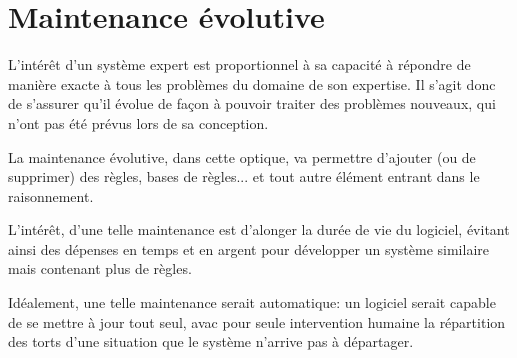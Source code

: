 \section{Maintenance évolutive}

L'intérêt d'un système expert est proportionnel à sa capacité à répondre
de manière exacte à tous les problèmes du domaine de son expertise. Il 
s'agit donc de s'assurer qu'il évolue de façon à pouvoir traiter des
problèmes nouveaux, qui n'ont pas été prévus lors de sa conception.

La maintenance évolutive, dans cette optique, va permettre d'ajouter (ou
de supprimer) des règles, bases de règles... et tout autre élément entrant
dans le raisonnement.

L'intérêt, d'une telle maintenance est d'alonger la durée de vie du
logiciel, évitant ainsi des dépenses en temps et en argent pour 
développer un système similaire mais contenant plus de règles.

Idéalement, une telle maintenance serait automatique: un logiciel serait
capable de se mettre à jour tout seul, avac pour seule intervention
humaine la répartition des torts d'une situation que le système n'arrive
pas à départager. 
